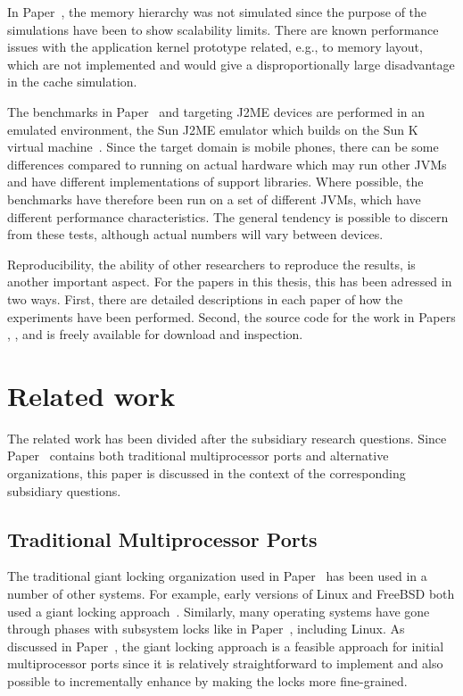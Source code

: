 In Paper~, the memory hierarchy was not simulated
since the purpose of the simulations have been to show scalability limits.
There are known performance issues with the application kernel prototype
related, e.g., to memory layout, which are not implemented and would give a
disproportionally large disadvantage in the cache simulation.

The benchmarks in Paper~ and 
targeting J2ME devices are performed in an emulated environment, the Sun J2ME
emulator which builds on the Sun K virtual machine~\cite{sun00kvm}. Since the
target domain is mobile phones, there can be some differences compared to
running on actual hardware which may run other JVMs and have different
implementations of support libraries. Where possible, the benchmarks have
therefore been run on a set of different JVMs, which have different
performance characteristics. The general tendency is possible to discern from
these tests, although actual numbers will vary between devices.

Reproducibility, the ability of other researchers to reproduce the results, is
another important aspect. For the papers in this thesis, this has been
adressed in two ways. First, there are detailed descriptions in each paper of
how the experiments have been performed. Second, the source code for the work
in Papers , ,  and
 is freely available for download and inspection.

\section{Related work}
\label{sec:intro:related_work}
The related work has been divided after the subsidiary research questions.
Since Paper~ contains both traditional multiprocessor
ports and alternative organizations, this paper is discussed in the context of
the corresponding subsidiary questions.


\subsection{Traditional Multiprocessor Ports}
The traditional giant locking organization used in
Paper~ has been used in a number of other systems.
For example, early versions of Linux and FreeBSD both used a giant locking
approach~\cite{beck98linux, lehey03freebsd}. Similarly, many operating systems
have gone through phases with subsystem locks like in
Paper~, including Linux. As discussed in
Paper~, the giant locking approach is a feasible approach
for initial multiprocessor ports since it is relatively straightforward to
implement and also possible to incrementally enhance by making the locks more
fine-grained.

